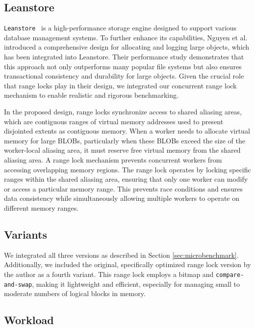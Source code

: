 \subsection{Leanstore}

\texttt{Leanstore}~\parencite{leis2018leanstore} is a high-performance storage engine designed to support various database management systems. 
To further enhance its capabilities, Nguyen et al.~\parencite{nguyen2024files} introduced a comprehensive design for allocating and logging large objects, which has been integrated into Leanstore. 
Their performance study demonstrates that this approach not only outperforms many popular file systems but also ensures transactional consistency and durability for large objects. Given the crucial role that range locks play in their design, we integrated our concurrent range lock mechanism to enable realistic and rigorous benchmarking.

In the proposed design, range locks synchronize access to shared aliasing areas, which are contiguous ranges of virtual memory addresses used to present disjointed extents as contiguous memory. 
When a worker needs to allocate virtual memory for large BLOBs, particularly when these BLOBs exceed the size of the worker-local aliasing area, it must reserve free virtual memory from the shared aliasing area. 
A range lock mechanism prevents concurrent workers from accessing overlapping memory regions. 
The range lock operates by locking specific ranges within the shared aliasing area, ensuring that only one worker can modify or access a particular memory range. 
This prevents race conditions and ensures data consistency while simultaneously allowing multiple workers to operate on different memory ranges. 

\subsection{Variants}

We integrated all three versions as described in Section \ref{sec:microbenchmark}. 
Additionally, we included the original, specifically optimized range lock version by the author as a fourth variant. 
This range lock employs a bitmap and \texttt{compare-and-swap}, making it lightweight and efficient, especially for managing small to moderate numbers of logical blocks in memory.

\subsection{Workload}

